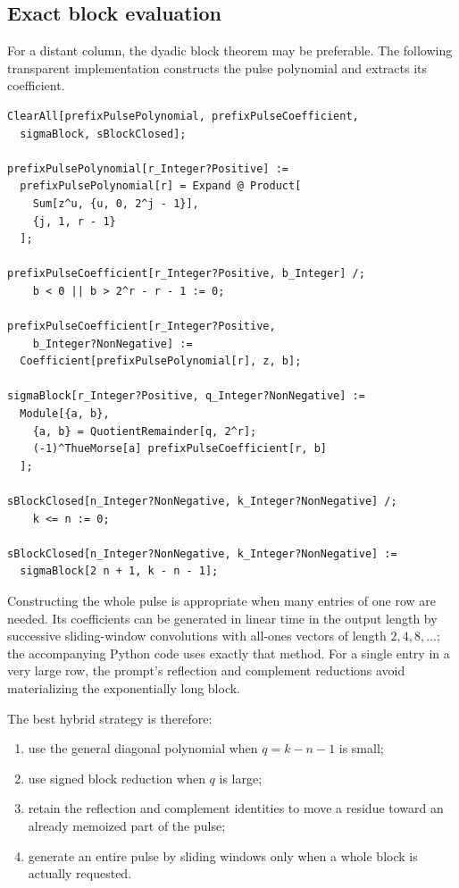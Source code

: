 \documentclass[11pt]{article}
\theoremstyle{definition}
\theoremstyle{remark}
\begin{document}
\subsection{Exact block evaluation}

For a distant column, the dyadic block theorem may be preferable.  The
following transparent implementation constructs the pulse polynomial and
extracts its coefficient.

\begin{lstlisting}[language=Wolfram,caption={Exact signed block evaluator.}]
ClearAll[prefixPulsePolynomial, prefixPulseCoefficient,
  sigmaBlock, sBlockClosed];

prefixPulsePolynomial[r_Integer?Positive] :=
  prefixPulsePolynomial[r] = Expand @ Product[
    Sum[z^u, {u, 0, 2^j - 1}],
    {j, 1, r - 1}
  ];

prefixPulseCoefficient[r_Integer?Positive, b_Integer] /;
    b < 0 || b > 2^r - r - 1 := 0;

prefixPulseCoefficient[r_Integer?Positive,
    b_Integer?NonNegative] :=
  Coefficient[prefixPulsePolynomial[r], z, b];

sigmaBlock[r_Integer?Positive, q_Integer?NonNegative] :=
  Module[{a, b},
    {a, b} = QuotientRemainder[q, 2^r];
    (-1)^ThueMorse[a] prefixPulseCoefficient[r, b]
  ];

sBlockClosed[n_Integer?NonNegative, k_Integer?NonNegative] /;
    k <= n := 0;

sBlockClosed[n_Integer?NonNegative, k_Integer?NonNegative] :=
  sigmaBlock[2 n + 1, k - n - 1];
\end{lstlisting}

Constructing the whole pulse is appropriate when many entries of one row are
needed.  Its coefficients can be generated in linear time in the output
length by successive sliding-window convolutions with all-ones vectors of
length \(2,4,8,\ldots\); the accompanying Python code uses exactly that
method.  For a single entry in a very large row, the prompt's reflection and
complement reductions avoid materializing the exponentially long block.

The best hybrid strategy is therefore:

\begin{enumerate}[leftmargin=2.2em]
\item use the general diagonal polynomial when \(q=k-n-1\) is small;
\item use signed block reduction when \(q\) is large;
\item retain the reflection and complement identities to move a residue
toward an already memoized part of the pulse;
\item generate an entire pulse by sliding windows only when a whole block is
actually requested.
\end{enumerate}
\end{document}
